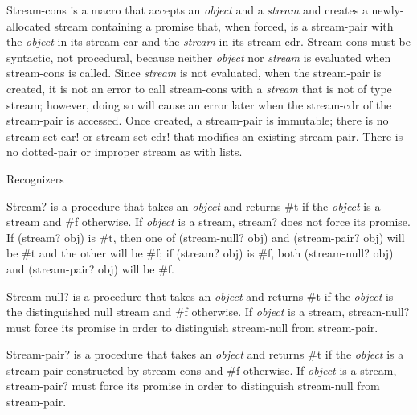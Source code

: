 \begin{entry}{%
  }

  Stream-cons is a macro that accepts an \emph{object} and a
  \emph{stream} and creates a newly-allocated stream containing a
  promise that, when forced, is a stream-pair with the \emph{object}
  in its stream-car and the \emph{stream} in its
  stream-cdr. Stream-cons must be syntactic, not procedural, because
  neither \emph{object} nor \emph{stream} is evaluated when
  stream-cons is called. Since \emph{stream} is not evaluated, when
  the stream-pair is created, it is not an error to call stream-cons
  with a \emph{stream} that is not of type stream; however, doing so
  will cause an error later when the stream-cdr of the stream-pair is
  accessed. Once created, a stream-pair is immutable; there is no
  stream-set-car! or stream-set-cdr! that modifies an existing
  stream-pair. There is no dotted-pair or improper stream as with
  lists.
\end{entry}

Recognizers 

\begin{entry}{%
  }

  Stream? is a procedure that takes an \emph{object} and returns \#t
  if the \emph{object} is a stream and \#f otherwise. If \emph{object}
  is a stream, stream? does not force its promise. If (stream? obj) is
  \#t, then one of (stream-null? obj) and (stream-pair? obj) will be
  \#t and the other will be \#f; if (stream? obj) is \#f, both
  (stream-null? obj) and (stream-pair? obj) will be \#f.
\end{entry}

\begin{entry}{%
  }

  Stream-null? is a procedure that takes an \emph{object} and returns
  \#t if the \emph{object} is the distinguished null stream and \#f
  otherwise.  If \emph{object} is a stream, stream-null? must force
  its promise in order to distinguish stream-null from stream-pair.
\end{entry}

\begin{entry}{%
  }

  Stream-pair? is a procedure that takes an \emph{object} and returns
  \#t if the \emph{object} is a stream-pair constructed by stream-cons
  and \#f otherwise. If \emph{object} is a stream, stream-pair? must
  force its promise in order to distinguish stream-null from
  stream-pair.
\end{entry}

